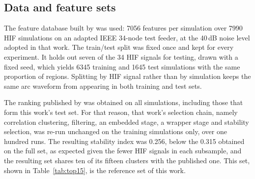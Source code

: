 \documentclass[11pt,a4paper]{article}
\begin{document}
\subsection{Data and feature sets}
\label{sec:data}
The feature database built by \citet{martins_tcc_en} was used: 7056 features per simulation over 7990 HIF simulations on an adapted IEEE 34-node test feeder, at the 40\,dB noise level adopted in that work. The train/test split was fixed once and kept for every experiment. It holds out seven of the 34 HIF signals for testing, drawn with a fixed seed, which yields 6345 training and 1645 test simulations with the same proportion of regions. Splitting by HIF signal rather than by simulation keeps the same arc waveform from appearing in both training and test sets.

The ranking published by \citet{martins_tcc_en} was obtained on all simulations, including those that form this work's test set. For that reason, that work's selection chain, namely correlation clustering, filtering, an embedded stage, a wrapper stage and stability selection, was re-run unchanged on the training simulations only, over one hundred runs. The resulting stability index was 0.256, below the 0.315 obtained on the full set, as expected given the fewer HIF signals in each subsample, and the resulting set shares ten of its fifteen clusters with the published one. This set, shown in Table~\ref{tab:top15}, is the reference set of this work.
\end{document}
